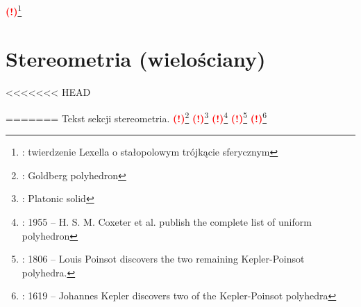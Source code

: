 \documentclass{greaseproof}
\newcommand{\todofoot}[1]{\textcolor{red}{\textbf{(!)}\footnote{\textbf{\color{red}{Do zrobienia}}: #1}}}
\begin{document}
\todofoot{twierdzenie Lexella o stałopolowym trójkącie sferycznym}

\chapter{Stereometria (wielościany)}
<<<<<<< HEAD

=======
Tekst sekcji stereometria.
\todofoot{Goldberg polyhedron} %
\todofoot{Platonic solid} %
\todofoot{1955 – H. S. M. Coxeter et al. publish the complete list of uniform polyhedron}
\todofoot{1806 – Louis Poinsot discovers the two remaining Kepler-Poinsot polyhedra.}
\todofoot{1619 – Johannes Kepler discovers two of the Kepler-Poinsot polyhedra}
\end{document}
